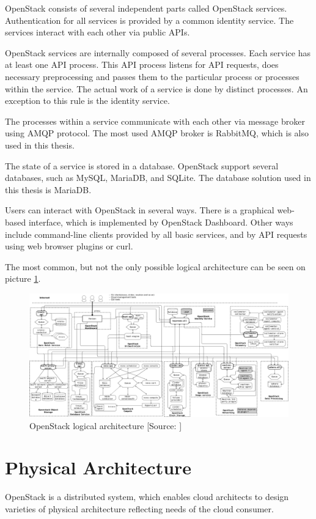 OpenStack consists of several independent parts called OpenStack services.\cite{CL210} Authentication for all services is provided by a common identity service. The services interact with each other via public APIs. \cite{AdminGuide}

OpenStack services are internally composed of several processes. Each service has at least one API process. This API process listens for API requests, does necessary preprocessing and passes them to the particular process or processes within the service. The actual work of a service is done by distinct processes. An exception to this rule is the identity service.

The processes within a service communicate with each other via message broker using AMQP protocol. The most used AMQP broker is RabbitMQ, which is also used in this thesis.

The state of a service is stored in a database. OpenStack support several databases, such as MySQL, MariaDB, and SQLite. The database solution used in this thesis is MariaDB. \cite{AdminGuide}

Users can interact with OpenStack in several ways. There is a graphical web-based interface, which is implemented by OpenStack Dashboard. Other ways include command-line clients provided by all basic services, and by API requests using web browser plugins or curl.

The most common, but not the only possible logical architecture can be seen on picture \ref{fig:OpenStack_logical_arch}.

\begin{figure}[!h]
  \includegraphics[width=\textwidth]{fig/OpenStack_logical_architecture.png}
  \caption{OpenStack logical architecture [Source: \cite{logicalArch}]}
  \label{fig:OpenStack_logical_arch}
\end{figure}

\section{Physical Architecture}
OpenStack is a distributed system, which enables cloud architects to design varieties of physical architecture reflecting needs of the cloud consumer.

